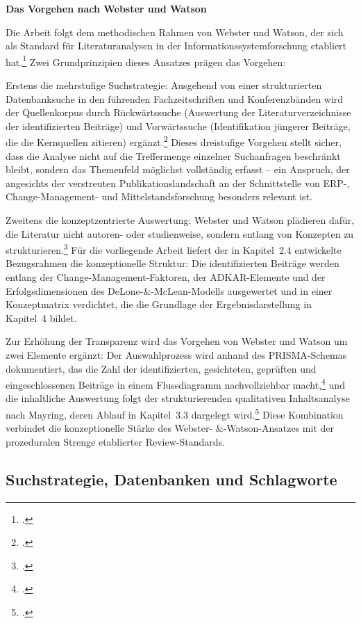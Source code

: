 \textbf{Das Vorgehen nach Webster und Watson}

Die Arbeit folgt dem methodischen Rahmen von Webster und Watson, der sich als Standard f\"ur Literaturanalysen in der Informationssystemforschung etabliert hat.\footcite[Vgl.][S.~xiii--xxiii]{webster2002} Zwei Grundprinzipien dieses Ansatzes pr\"agen das Vorgehen:

Erstens die mehrstufige Suchstrategie: Ausgehend von einer strukturierten Datenbanksuche in den f\"uhrenden Fachzeitschriften und Konferenzb\"anden wird der Quellenkorpus durch R\"uckw\"artssuche (Auswertung der Literaturverzeichnisse der identifizierten Beitr\"age) und Vorw\"artssuche (Identifikation j\"ungerer Beitr\"age, die die Kernquellen zitieren) erg\"anzt.\footcite[Vgl.][S.~xvi]{webster2002} Dieses dreistufige Vorgehen stellt sicher, dass die Analyse nicht auf die Treffermenge einzelner Suchanfragen beschr\"ankt bleibt, sondern das Themenfeld m\"oglichst vollst\"andig erfasst -- ein Anspruch, der angesichts der verstreuten Publikationslandschaft an der Schnittstelle von ERP-, Change-Management- und Mittelstandsforschung besonders relevant ist.

Zweitens die konzeptzentrierte Auswertung: Webster und Watson pl\"adieren daf\"ur, die Literatur nicht autoren- oder studienweise, sondern entlang von Konzepten zu strukturieren.\footcite[Vgl.][S.~xvi--xvii]{webster2002} F\"ur die vorliegende Arbeit liefert der in Kapitel~2.4 entwickelte Bezugsrahmen die konzeptionelle Struktur: Die identifizierten Beitr\"age werden entlang der Change-Management-Faktoren, der ADKAR-Elemente und der Erfolgsdimensionen des DeLone-\&-McLean-Modells ausgewertet und in einer Konzeptmatrix verdichtet, die die Grundlage der Ergebnisdarstellung in Kapitel~4 bildet.

Zur Erh\"ohung der Transparenz wird das Vorgehen von Webster und Watson um zwei Elemente erg\"anzt: Der Auswahlprozess wird anhand des PRISMA-Schemas dokumentiert, das die Zahl der identifizierten, gesichteten, gepr\"uften und eingeschlossenen Beitr\"age in einem Flussdiagramm nachvollziehbar macht,\footcite[Vgl.][S.~1--3]{page2021} und die inhaltliche Auswertung folgt der strukturierenden qualitativen Inhaltsanalyse nach Mayring, deren Ablauf in Kapitel~3.3 dargelegt wird.\footcite[Vgl.][S.~50~ff.]{mayring2015} Diese Kombination verbindet die konzeptionelle St\"arke des Webster- \&-Watson-Ansatzes mit der prozeduralen Strenge etablierter Review-Standards.

\subsection{Suchstrategie, Datenbanken und Schlagworte}

